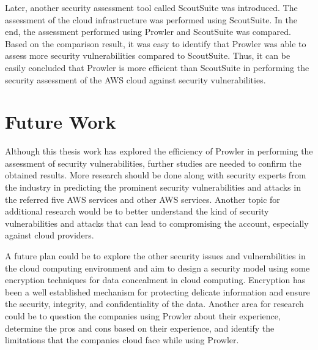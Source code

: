 \par Later, another security assessment tool called ScoutSuite was introduced.
The assessment of the cloud infrastructure was performed using ScoutSuite.
In the end, the assessment performed using Prowler and ScoutSuite was compared.
Based on the comparison result, it was easy to identify that Prowler was able to assess more security vulnerabilities compared to ScoutSuite.
Thus, it can be easily concluded that Prowler is more
efficient than ScoutSuite in performing the security assessment of the AWS cloud against security vulnerabilities.




\section{Future Work}

\par Although this thesis work has explored the efficiency of Prowler in performing the assessment of security vulnerabilities, further studies are needed to confirm the obtained results.
More research should be done along with security experts from the industry in predicting the prominent security vulnerabilities and attacks in the referred five AWS services and other AWS services.
Another topic for additional research would be to better understand the kind of security vulnerabilities and attacks that can lead to compromising the account, especially against cloud providers.

\par A future plan could be to explore the other security issues and vulnerabilities in the cloud computing environment and aim to design a security model using some encryption techniques for data concealment in cloud computing.
Encryption has been a well established mechanism for protecting delicate information and ensure the security, integrity, and confidentiality of the data.
Another area for research could be to question the companies using Prowler about their experience, determine the pros and cons based on their experience, and identify the limitations that the companies cloud face while using Prowler.